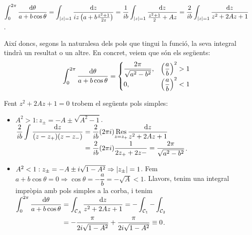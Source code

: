 \begin{sproof}
	$\displaystyle \int_{0}^{2\pi} \frac{\mathrm{d} \theta}{a + b \cos \theta} = \int_{\left| z \right| = 1} \frac{\mathrm{d} z}{iz \left( a + b \frac{z^{2}+1}{2z} \right)} = \frac{1}{ib} \int_{\left| z \right| = 1} \frac{\mathrm{d} z}{\frac{z^{2} + 1}{2} + Az} = \frac{2}{ib} \int_{\left| z \right| = 1} \frac{\mathrm{d} z}{z^{2} + 2Az + 1}$.
\end{sproof}
Així doncs, segons la naturalesa dels pols que tingui la funció, la seva integral tindrà un resultat o un altre. En concret, veiem que són els següents:
\begin{align}
    \int_{0}^{2\pi} \frac{\mathrm{d} \theta}{a + b \cos \theta} = \begin{cases} \dfrac{2\pi}{\sqrt{a^{2} - b^{2}}}, & \left( \dfrac{a}{b} \right)^{2} > 1 \\ 0, & \left( \dfrac{a}{b} \right)^{2} < 1 \end{cases}
\end{align}
\begin{sproof}
    Fent $z^{2} + 2Az + 1 = 0$ trobem el següents pols simples:
    \begin{itemize}
    	\item $A^{2} > 1: z_{\pm} = -A \pm \sqrt{A^{2} -1}$.
    	    \newline $\displaystyle \dfrac{2}{ib} \int \dfrac{\mathrm{d} z}{(z - z_{+})(z - z_{-})} = \dfrac{2}{ib} (2\pi i) \underset{z = z_{+}}{\operatorname{Res}} \dfrac{\mathrm{d} z}{z^{2} + 2Az + 1}$
    	    \newline $\displaystyle \phantom{\dfrac{2}{ib} \int \dfrac{\dif z}{(z - z_{+})(z - z_{-})}} = \frac{2}{ib} (2\pi i) \dfrac{1}{2z_{+} + 2z{-}} = \dfrac{2\pi}{\sqrt{a^{2} - b^{2}}}$.
    	\item $A^{2} < 1: z_{\pm} = -A \pm i \sqrt{1 - A^{2}} \Rightarrow \left| z_{\pm} \right| = 1$.
        	\newline Fem $a + b \cos \theta = 0 \Rightarrow \cos \theta = -\dfrac{a}{b} = - \sqrt{A} < 1$. Llavors, tenim una integral impròpia amb pols simples a la corba, i tenim
        	\newline $\displaystyle \int_{0}^{2\pi} \frac{\mathrm{d} \theta}{a + b \cos \theta} = \int_{\mathcal{C}_{A}} \frac{\mathrm{d} z}{z^{2} + 2Az + 1} = - \int_{\mathcal{C}_{1}} - \int_{\mathcal{C}_{2}}$
        	\newline $\displaystyle \phantom{\int_{0}^{2\pi} \frac{\dif \theta}{a + b \cos \theta}} = - \dfrac{\pi}{2i\sqrt{1-A^{2}}} + \dfrac{\pi}{2i \sqrt{1-A^{2}}} \equiv 0$.
    \end{itemize}
\end{sproof}


